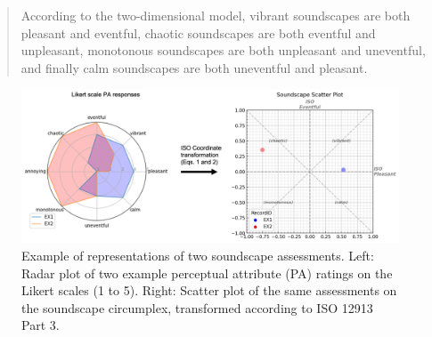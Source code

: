 \begin{quote}
  According to the two-dimensional model, vibrant soundscapes are both pleasant and eventful, chaotic soundscapes are both eventful and unpleasant, monotonous soundscapes are both unpleasant and uneventful, and finally calm soundscapes are both uneventful and pleasant.
\end{quote}

\begin{figure}
  \includegraphics[width=\textwidth]{Figures/jasa-el_Figure1.png}
  \caption{Example of representations of two soundscape assessments. Left: Radar plot of two example perceptual attribute (PA) ratings on the Likert scales (1 to 5). Right: Scatter plot of the same assessments on the soundscape circumplex, transformed according to ISO 12913 Part 3.
    \label{fig:radar}
  }
\end{figure}

